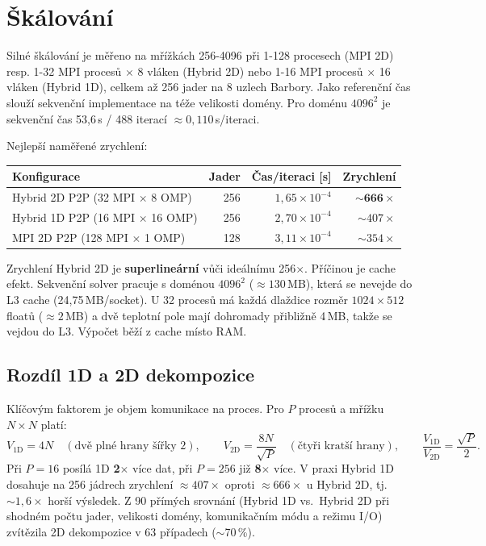 \documentclass{article}
\begin{document}
\section{Škálování}
\label{sec:skalovani}

Silné škálování je měřeno na mřížkách 256-4096 při 1-128 procesech
(MPI 2D) resp. 1-32 MPI procesů $\times$ 8 vláken (Hybrid 2D) nebo
1-16 MPI procesů $\times$ 16 vláken (Hybrid 1D), celkem až 256 jader
na 8 uzlech Barbory.
Jako referenční čas slouží sekvenční implementace na téže velikosti domény.
Pro doménu $4096^2$ je sekvenční čas 53{,}6\,s / 488 iterací
$\approx 0{,}110$\,s/iteraci.

Nejlepší naměřené zrychlení:
\begin{center}
\begin{tabular}{lrrr}
\toprule
Konfigurace & Jader & Čas/iteraci [s] & Zrychlení \\
\midrule
Hybrid 2D P2P (32 MPI $\times$ 8 OMP) & 256 & $1{,}65 \times 10^{-4}$ & $\mathbf{\sim 666\times}$ \\
Hybrid 1D P2P (16 MPI $\times$ 16 OMP) & 256 & $2{,}70 \times 10^{-4}$ & $\sim 407\times$ \\
MPI 2D P2P (128 MPI $\times$ 1 OMP)   & 128 & $3{,}11 \times 10^{-4}$ & $\sim 354\times$ \\
\bottomrule
\end{tabular}
\end{center}

Zrychlení Hybrid 2D je \textbf{superlineární} vůči ideálnímu 256$\times$.
Příčinou je cache efekt. Sekvenční solver pracuje s doménou $4096^2$
($\approx 130$\,MB), která se nevejde do L3 cache (24{,}75\,MB/socket).
U 32 procesů má každá dlaždice rozměr $1024 \times 512$ floatů ($\approx 2$\,MB)
a dvě teplotní pole mají dohromady přibližně 4\,MB, takže se vejdou do L3.
Výpočet běží z cache místo RAM.

\subsection*{Rozdíl 1D a 2D dekompozice}
Klíčovým faktorem je objem komunikace na proces.
Pro $P$ procesů a mřížku $N \times N$ platí:
\[
  V_\text{1D} = 4N \quad (\text{dvě plné hrany šířky 2}),\qquad
  V_\text{2D} = \frac{8N}{\sqrt{P}} \quad (\text{čtyři kratší hrany}),\qquad
  \frac{V_\text{1D}}{V_\text{2D}} = \frac{\sqrt{P}}{2}.
\]
Při $P = 16$ posílá 1D \textbf{2$\times$} více dat, při $P = 256$
již \textbf{8$\times$} více.
V praxi Hybrid 1D dosahuje na 256 jádrech zrychlení $\approx 407\times$
oproti $\approx 666\times$ u Hybrid 2D, tj. $\sim 1{,}6\times$ horší výsledek.
Z 90 přímých srovnání (Hybrid 1D vs.\ Hybrid 2D při shodném počtu jader,
velikosti domény, komunikačním módu a režimu I/O) zvítězila 2D dekompozice
v 63 případech ($\sim$70\,\%).
\end{document}
